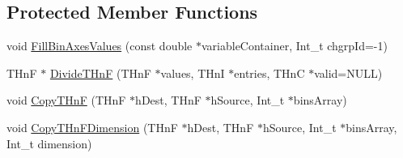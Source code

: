 \subsection*{Protected Member Functions}
\begin{DoxyCompactItemize}
\item 
void \mbox{\hyperlink{classQn_1_1CorrectionHistogramBase_a21da2e5193ac94021e3722f312e1bf43}{Fill\+Bin\+Axes\+Values}} (const double $\ast$variable\+Container, Int\+\_\+t chgrp\+Id=-\/1)
\item 
T\+HnF $\ast$ \mbox{\hyperlink{classQn_1_1CorrectionHistogramBase_a6396452bcab8dd219abccb9ebcd4e678}{Divide\+T\+HnF}} (T\+HnF $\ast$values, T\+HnI $\ast$entries, T\+HnC $\ast$valid=N\+U\+LL)
\item 
void \mbox{\hyperlink{classQn_1_1CorrectionHistogramBase_a9f547f6017645f6daa81832f35a58999}{Copy\+T\+HnF}} (T\+HnF $\ast$h\+Dest, T\+HnF $\ast$h\+Source, Int\+\_\+t $\ast$bins\+Array)
\item 
void \mbox{\hyperlink{classQn_1_1CorrectionHistogramBase_af305e98602353545b8b5db23484cfd1c}{Copy\+T\+Hn\+F\+Dimension}} (T\+HnF $\ast$h\+Dest, T\+HnF $\ast$h\+Source, Int\+\_\+t $\ast$bins\+Array, Int\+\_\+t dimension)
\end{DoxyCompactItemize}

